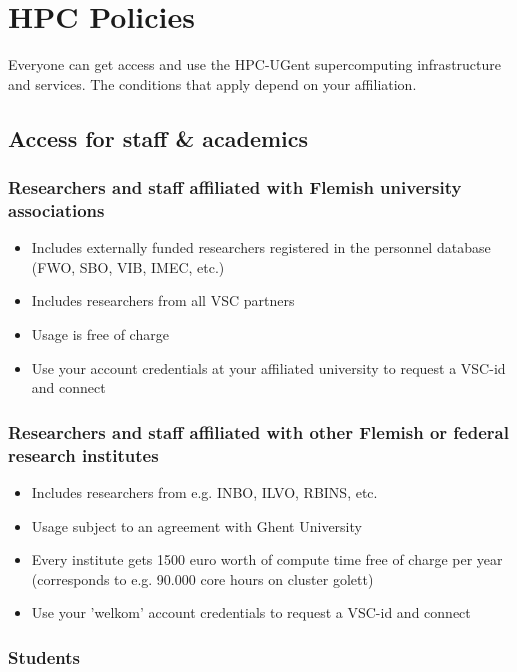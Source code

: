 \chapter{HPC Policies}
\label{ch:hpc-policies}

Everyone can get access and use the HPC-UGent supercomputing infrastructure and services.
The conditions that apply depend on your affiliation.

\section{Access for staff & academics}

\subsection{Researchers and staff affiliated with Flemish university associations}

\begin{itemize}
  \item Includes externally funded researchers registered in the personnel database (FWO, SBO, VIB, IMEC, etc.)
  \item Includes researchers from all VSC partners
  \item Usage is free of charge
  \item Use your account credentials at your affiliated university to request a VSC-id and connect
\end{itemize}


\subsection{Researchers and staff affiliated with other Flemish or federal research institutes}

\begin{itemize}
  \item Includes researchers from e.g. INBO, ILVO, RBINS, etc.
  \item Usage subject to an agreement with Ghent University
  \item Every institute gets 1500 euro worth of compute time free of charge per year (corresponds to e.g. 90.000 core hours on cluster golett)
  \item Use your 'welkom' account credentials to request a VSC-id and connect
\end{itemize}


\subsection{Students}

